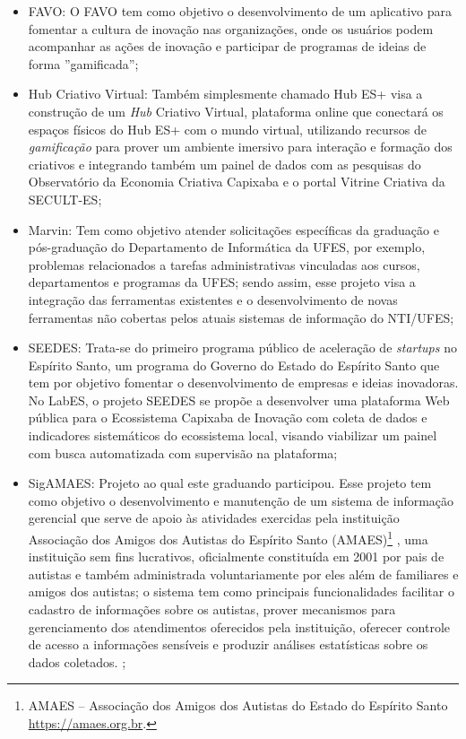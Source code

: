 \begin{itemize}
	\item FAVO: O FAVO tem como objetivo o desenvolvimento de um aplicativo para fomentar a cultura de inovação nas organizações, onde os usuários podem acompanhar as ações de inovação e participar de programas de ideias de forma ''gamificada'';
	
	\item Hub Criativo Virtual: Também simplesmente chamado Hub ES+ visa a construção de um \textit{Hub} Criativo Virtual, plataforma online que conectará os espaços físicos do Hub ES+ com o mundo virtual, utilizando recursos de \textit{gamificação} para prover um ambiente imersivo para interação e formação dos criativos e integrando também um painel de dados com as pesquisas do Observatório da Economia Criativa Capixaba e o portal Vitrine Criativa da SECULT-ES;
	
	\item Marvin: Tem como objetivo atender solicitações específicas da graduação e pós-graduação do Departamento de Informática da UFES, por exemplo, problemas relacionados a tarefas administrativas vinculadas aos cursos, departamentos e programas da UFES; sendo assim, esse projeto visa a integração das ferramentas existentes e o desenvolvimento de novas ferramentas não cobertas pelos atuais sistemas de informação do NTI/UFES;
	
	\item SEEDES: Trata-se do primeiro programa público de aceleração de \textit{startups} no Espírito Santo, um programa do Governo do Estado do Espírito Santo que tem por objetivo fomentar o desenvolvimento de empresas e ideias inovadoras. No LabES, o projeto SEEDES se propõe a desenvolver uma plataforma Web pública para o Ecossistema Capixaba de Inovação com coleta de dados e indicadores sistemáticos do ecossistema local, visando viabilizar um painel com busca automatizada com supervisão na plataforma;
	
	\item SigAMAES: Projeto ao qual este graduando participou. Esse projeto tem como objetivo o desenvolvimento e manutenção de um sistema de informação gerencial que serve de apoio às atividades exercidas pela instituição Associação dos Amigos dos Autistas do Espírito Santo (AMAES)\footnote{AMAES – Associação dos Amigos dos Autistas do Estado do Espírito Santo \url{https://amaes.org.br}.}
, uma instituição sem fins lucrativos, oficialmente constituída em 2001 por pais de autistas e também administrada voluntariamente por eles além de familiares e amigos dos autistas; o sistema tem como principais funcionalidades facilitar o cadastro de informações sobre os autistas, prover mecanismos para gerenciamento dos atendimentos oferecidos pela instituição, oferecer controle de acesso a informações sensíveis e produzir análises estatísticas sobre os dados coletados. ;
\end{itemize}
